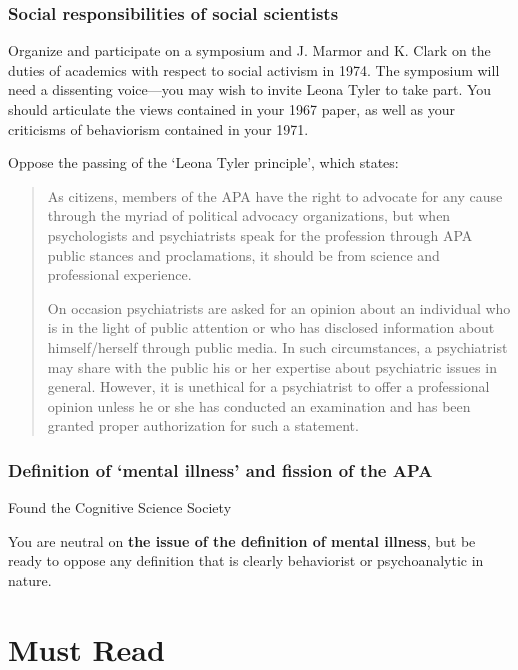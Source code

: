 \begin{refsection}
\subsubsection{Social responsibilities of social scientists}
\label{socialresponsibilitiesofsocialscientists}

Organize and participate on a symposium and J. Marmor and K. Clark on the duties of academics with respect to social activism in 1974. The symposium will need a dissenting voice---you may wish to invite Leona Tyler to take part. You should articulate the views contained in your 1967 paper, as well as your criticisms of behaviorism contained in your 1971.

Oppose the passing of the `Leona Tyler principle', which states:

\begin{quote}

As citizens, members of the APA have the right to advocate for any cause through the myriad of political advocacy organizations, but when psychologists and psychiatrists speak for the profession through APA public stances and proclamations, it should be from science and professional experience.

On occasion psychiatrists are asked for an opinion about an individual who is in the light of public attention or who has disclosed information about himself\slash herself through public media. In such circumstances, a psychiatrist may share with the public his or her expertise about psychiatric issues in general. However, it is unethical for a psychiatrist to offer a professional opinion unless he or she has conducted an examination and has been granted proper authorization for such a statement.
\end{quote}

\subsubsection{Definition of ‘mental illness’ and fission of the APA}
\label{definitionof‘mentalillness’andfissionoftheapa}

Found the Cognitive Science Society

You are neutral on \textbf{the issue of the definition of mental illness}, but be ready to oppose any definition that is clearly behaviorist or psychoanalytic in nature.

\section{Must Read}
\label{mustread}


\end{refsection}
